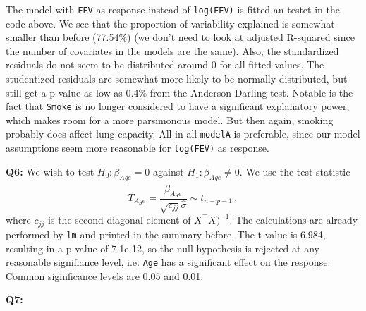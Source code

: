 \documentclass[]{article}
\newenvironment{Shaded}{\begin{snugshade}}{\end{snugshade}}
\newcommand{\KeywordTok}[1]{\textcolor[rgb]{0.13,0.29,0.53}{\textbf{#1}}}
\newcommand{\DecValTok}[1]{\textcolor[rgb]{0.00,0.00,0.81}{#1}}
\newcommand{\FloatTok}[1]{\textcolor[rgb]{0.00,0.00,0.81}{#1}}
\newcommand{\StringTok}[1]{\textcolor[rgb]{0.31,0.60,0.02}{#1}}
\newcommand{\OperatorTok}[1]{\textcolor[rgb]{0.81,0.36,0.00}{\textbf{#1}}}
\newcommand{\NormalTok}[1]{#1}
\begin{document}
The model with \texttt{FEV} as response instead of \texttt{log(FEV)} is
fitted an testet in the code above. We see that the proportion of
variability explained is somewhat smaller than before (77.54\%) (we
don't need to look at adjusted R-squared since the number of covariates
in the models are the same). Also, the standardized residuals do not
seem to be distributed around 0 for all fitted values. The studentized
residuals are somewhat more likely to be normally distributed, but still
get a p-value as low as 0.4\% from the Anderson-Darling test. Notable is
the fact that \texttt{Smoke} is no longer considered to have a
significant explanatory power, which makes room for a more parsimonous
model. But then again, smoking probably does affect lung capacity. All
in all \texttt{modelA} is preferable, since our model assumptions seem
more reasonable for \texttt{log(FEV)} as response.

\textbf{Q6:} We wish to test \(H_0: \beta_{Age} = 0\) against
\(H_1: \beta_{Age} \neq 0\). We use the test statistic
\[T_{Age} = \frac{\hat{\beta}_{Age}}{\sqrt{c_{jj}}\hat{\sigma}} \sim t_{n-p-1}\,
,\] where \(c_{jj}\) is the second diagonal element of
\(X^\intercal X)^{-1}\). The calculations are already performed by
\texttt{lm} and printed in the summary before. The t-value is 6.984,
resulting in a p-value of 7.1e-12, so the null hypothesis is rejected at
any reasonable signifiance level, i.e. \texttt{Age} has a significant
effect on the response. Common siginficance levels are 0.05 and 0.01.

\textbf{Q7:}

\begin{Shaded}
\end{Shaded}
\end{document}
